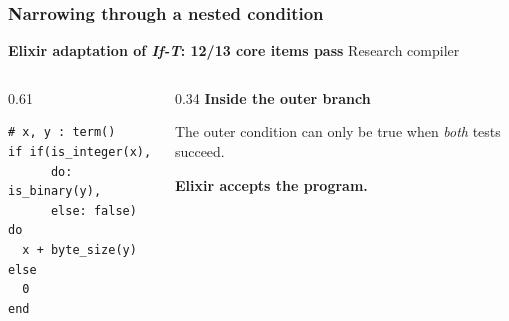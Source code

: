 \begin{frame}[fragile,t,label=perf-narrowing]
\frametitle{Narrowing through a nested condition}
\textbf{Elixir adaptation of \textit{If-T}: 12/13 core items pass}
\hfill{\small Research compiler}

\bigskip
\begin{columns}[T,onlytextwidth]
  \begin{column}{0.61\textwidth}
\begin{verbatim}
# x, y : term()
if if(is_integer(x),
      do: is_binary(y),
      else: false) do
  x + byte_size(y)
else
  0
end
\end{verbatim}
  \end{column}
  \begin{column}{0.34\textwidth}
    \textbf{Inside the outer branch}
    \medskip
    \par
    \par
    \medskip
    {\small The outer condition can only be true when \emph{both} tests
    succeed.\par}
    \smallskip
    \textbf{Elixir accepts the program.}
  \end{column}
\end{columns}


\end{frame}
